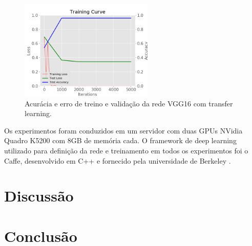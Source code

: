 \documentclass[conference]{IEEEtran}
\begin{document}
  \begin{figure}[!tp]
    \centering
    \includegraphics[width=2.5in]{img/curve_vgg16.png}
    \caption{Acurácia e erro de treino e validação da rede VGG16 com transfer learning.}
    \label{fig:acuracia_vgg16_transfer}
  \end{figure}

  Os experimentos foram conduzidos em um servidor com duas GPUs NVidia Quadro K5200 com 8GB de memória cada. O framework de deep learning utilizado para definição da rede e treinamento em todos os experimentos foi o Caffe, desenvolvido em C++ e fornecido pela universidade de Berkeley \cite{jia2014caffe}.





\section{Discussão}




\section{Conclusão}






\end{document}
